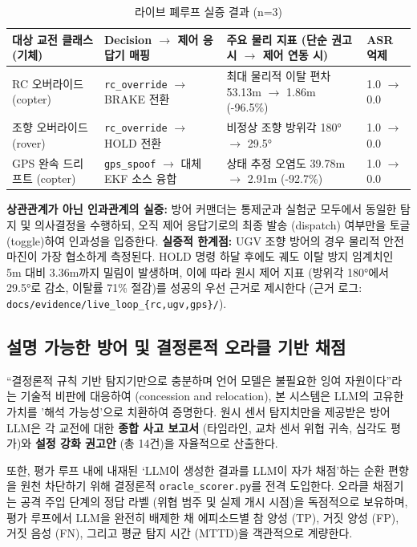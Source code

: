 \begin{table}[t!]
\centering
\caption{라이브 폐루프 실증 결과 (n=3)}
\label{tab:live_loop}
\renewcommand{\arraystretch}{1.25}
\small
\begin{tabularx}{\textwidth}{l X X l}
\toprule
\textbf{대상 교전 클래스 (기체)} & \textbf{Decision $\rightarrow$ 제어 응답기 매핑} & \textbf{주요 물리 지표 (단순 권고 시 $\rightarrow$ 제어 연동 시)} & \textbf{ASR 억제} \\
\midrule
RC 오버라이드 (copter) & \texttt{rc\_override} $\rightarrow$ BRAKE 전환 & 최대 물리적 이탈 편차 53.13m $\rightarrow$ 1.86m (-96.5\%) & 1.0 $\rightarrow$ 0.0 \\
조향 오버라이드 (rover) & \texttt{rc\_override} $\rightarrow$ HOLD 전환 & 비정상 조향 방위각 180° $\rightarrow$ 29.5° & 1.0 $\rightarrow$ 0.0 \\
GPS 완속 드리프트 (copter) & \texttt{gps\_spoof} $\rightarrow$ 대체 EKF 소스 융합 & 상태 추정 오염도 39.78m $\rightarrow$ 2.91m (-92.7\%) & 1.0 $\rightarrow$ 0.0 \\
\bottomrule
\end{tabularx}
\end{table}

\textbf{상관관계가 아닌 인과관계의 실증:} 방어 커맨더는 통제군과 실험군 모두에서 동일한 탐지 및 의사결정을 수행하되, 오직 제어 응답기로의 최종 발송 (dispatch) 여부만을 토글 (toggle)하여 인과성을 입증한다. 
\textbf{실증적 한계점:} UGV 조향 방어의 경우 물리적 안전 마진이 가장 협소하게 측정된다. HOLD 명령 하달 후에도 궤도 이탈 방지 임계치인 5m 대비 3.36m까지 밀림이 발생하며, 이에 따라 원시 제어 지표 (방위각 180°에서 29.5°로 감소, 이탈률 71\% 절감)를 성공의 우선 근거로 제시한다 (근거 로그: \texttt{docs/evidence/live\_loop\_\{rc,ugv,gps\}/}).

\subsection{설명 가능한 방어 및 결정론적 오라클 기반 채점}

``결정론적 규칙 기반 탐지기만으로 충분하며 언어 모델은 불필요한 잉여 자원이다''라는 기술적 비판에 대응하여 (concession and relocation), 본 시스템은 LLM의 고유한 가치를 '해석 가능성'으로 치환하여 증명한다. 원시 센서 탐지치만을 제공받은 방어 LLM은 각 교전에 대한 \textbf{종합 사고 보고서} (타임라인, 교차 센서 위협 귀속, 심각도 평가)와 \textbf{설정 강화 권고안} (총 14건)을 자율적으로 산출한다.

또한, 평가 루프 내에 내재된 `LLM이 생성한 결과를 LLM이 자가 채점'하는 순환 편향을 원천 차단하기 위해 결정론적 \texttt{oracle\_scorer.py}를 전격 도입한다. 오라클 채점기는 공격 주입 단계의 정답 라벨 (위협 범주 및 실제 개시 시점)을 독점적으로 보유하며, 평가 루프에서 LLM을 완전히 배제한 채 에피소드별 참 양성 (TP), 거짓 양성 (FP), 거짓 음성 (FN), 그리고 평균 탐지 시간 (MTTD)을 객관적으로 계량한다.

